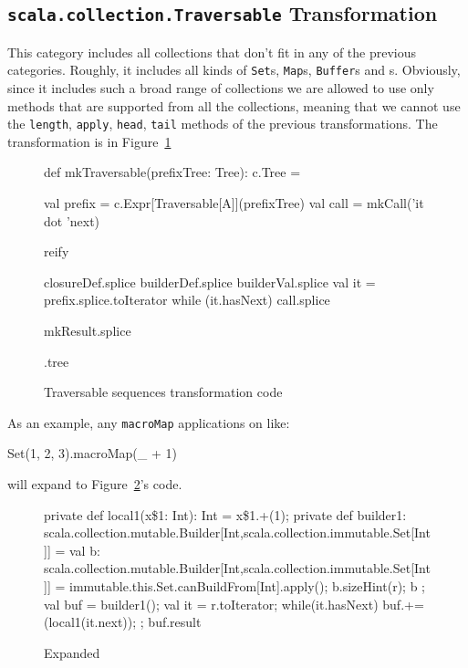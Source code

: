 \subsection{\texttt{scala.collection.Traversable} Transformation}

This category includes all collections that don't fit in any of the previous
categories. Roughly, it includes all kinds of \texttt{Set}s, \texttt{Map}s, \texttt{Buffer}s and
s. Obviously, since it includes such a broad range of
collections we are allowed to use only methods that are supported from all the
collections, meaning that we cannot use the \texttt{length}, \texttt{apply}, \texttt{head}, \texttt{tail} methods of the
previous transformations. The transformation is in Figure~\ref{trav_transf} 

\begin{figure}
\begin{scalaCode}
 def mkTraversable(prefixTree: Tree): c.Tree = {
  val prefix = c.Expr[Traversable[A]](prefixTree)
  val call   = mkCall('it dot 'next)

  reify {
    closureDef.splice
    builderDef.splice
    builderVal.splice
    val it = prefix.splice.toIterator
    while (it.hasNext)
      call.splice

    mkResult.splice
  }.tree
}
\end{scalaCode}
\caption[Traversable sequences transformation code]{Traversable sequences transformation code}
\label{trav_transf}
\end{figure}

As an
example, any \texttt{macroMap} applications on  like:

\begin{scalaCode}
Set(1, 2, 3).macroMap(\_ + 1)
\end{scalaCode}
will expand to Figure~\ref{set_expansion}'s code.

\begin{figure}
\begin{scalaCode}
{
  private def local1(x\$1: Int): Int = x\$1.+(1);
  private def builder1:
scala.collection.mutable.Builder[Int,scala.collection.immutable.Set[Int]] = {
    val b:
scala.collection.mutable.Builder[Int,scala.collection.immutable.Set[Int]] =
immutable.this.Set.canBuildFrom[Int].apply();
    b.sizeHint(r);
    b
  };
  val buf = builder1();
  val it = r.toIterator;
  while(it.hasNext){
    buf.+=(local1(it.next));
  };
  buf.result
}
\end{scalaCode}
\caption[Expanded ]{Expanded }
\label{set_expansion}
\end{figure}

